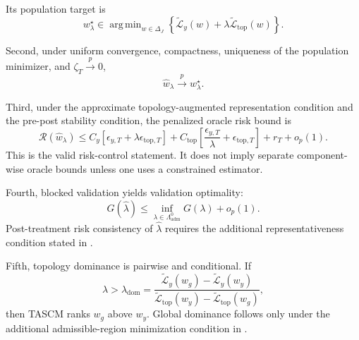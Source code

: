 \documentclass[11pt]{article}
\theoremstyle{plain}
\theoremstyle{definition}
\theoremstyle{remark}
\DeclareMathOperator*{\argmin}{arg\,min}
\newcommand{\1}{\mathbbm{1}}
\newcommand{\pto}{\xrightarrow{p}}
\begin{document}
Its population target is
\[
w_\lambda^\star
\in
\argmin_{w\in\Delta_J}
\left\{
\widetilde{\mathcal L}_y(w)
+
\lambda
\widetilde{\mathcal L}_{\mathrm{top}}(w)
\right\}.
\]

Second, under uniform convergence, compactness, uniqueness of the population
minimizer, and \(\zeta_T\pto0\),
\[
\widehat w_\lambda \pto w_\lambda^\star.
\]

Third, under the approximate topology-augmented representation condition and
the pre-post stability condition, the penalized oracle risk bound is
\[
\mathcal R(\widehat w_\lambda)
\le
C_y
\left[
\epsilon_{y,T}
+
\lambda\epsilon_{\mathrm{top},T}
\right]
+
C_{\mathrm{top}}
\left[
\frac{\epsilon_{y,T}}{\lambda}
+
\epsilon_{\mathrm{top},T}
\right]
+
r_T
+
o_p(1).
\]
This is the valid risk-control statement. It does not imply separate
component-wise oracle bounds unless one uses a constrained estimator.

Fourth, blocked validation yields validation optimality:
\[
G(\widehat\lambda)
\le
\inf_{\lambda\in\Lambda_{\mathrm{adm}}^0}
G(\lambda)
+
o_p(1).
\]
Post-treatment risk consistency of \(\widehat\lambda\) requires the additional
representativeness condition stated in .

Fifth, topology dominance is pairwise and conditional. If
\[
\lambda
>
\lambda_{\mathrm{dom}}
=
\frac{
\widetilde{\mathcal L}_y(w_g)
-
\widetilde{\mathcal L}_y(w_y)
}{
\widetilde{\mathcal L}_{\mathrm{top}}(w_y)
-
\widetilde{\mathcal L}_{\mathrm{top}}(w_g)
},
\]
then TASCM ranks \(w_g\) above \(w_y\). Global dominance follows only under the
additional admissible-region minimization condition in
.



\end{document}
